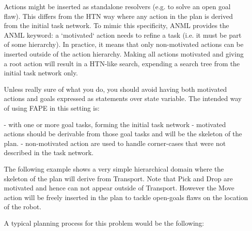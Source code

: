 Actions might be inserted as standalone resolvers (e.g. to solve an
open goal flaw).  This differs from the HTN way where any action in
the plan is derived from the initial task network.  To mimic this
specificity, ANML provides the ANML keyword: a `motivated` action
needs to refine a task (i.e. it must be part of some hierarchy).  In
practice, it means that only non-motivated actions can be inserted
outside of the action hierarchy.  Making all actions motivated and
giving a root action will result in a HTN-like search, expending a
search tree from the initial task network only.


Unless really sure of what you do, you should avoid having both
motivated actions and goals expressed as statements over state
variable.  The intended way of using FAPE in this setting is:

 - with one or more goal tasks, forming the initial task network
 - motivated actions should be derivable from those goal tasks and will be the skeleton of the plan.
 - non-motivated action are used to handle corner-cases that were not described in the task network.

The following example shows a very simple hierarchical domain where
the skeleton of the plan will derive from Transport. Note that Pick
and Drop are motivated and hence can not appear outside of Transport.
However the Move action will be freely inserted in the plan to tackle
open-goals flaws on the location of the robot.

A typical planning process for this problem would be the following:





